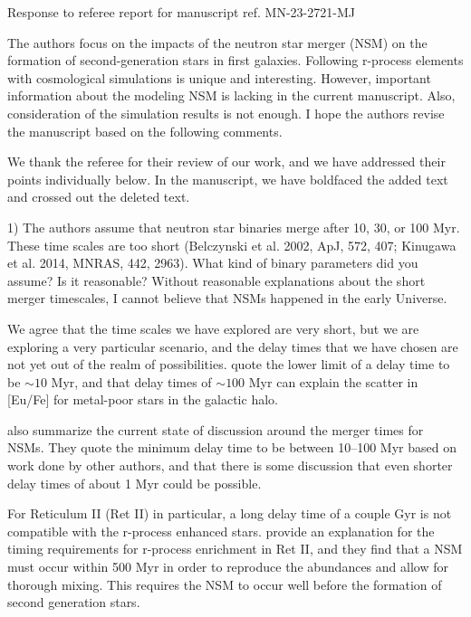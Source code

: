 \documentclass[11pt]{article}
\begin{document}
\begin{center} 
\bfseries{
\begin{large}
  Response to referee report for manuscript ref. MN-23-2721-MJ
\end{large}
}
\end{center}

\begin{tcolorbox}[colback={lightgray}]
    The authors focus on the impacts of the neutron star merger (NSM) on the formation of second-generation stars in first galaxies. Following r-process elements with cosmological simulations is unique and interesting. However, important information about the modeling NSM is lacking in the current manuscript. Also, consideration of the simulation results is not enough. I hope the authors revise the manuscript based on the following comments.
\end{tcolorbox}

We thank the referee for their review of our work, and we have
addressed their points individually below.  In the manuscript, we have
boldfaced the added text and crossed out the deleted text.  

\begin{tcolorbox}[colback={lightgray}]
    1)      The authors assume that neutron star binaries merge after 10, 30, or 100 Myr. These time scales are too short (Belczynski et al. 2002, ApJ, 572, 407; Kinugawa et al. 2014, MNRAS, 442, 2963). What kind of binary parameters did you assume? Is it reasonable? Without reasonable explanations about the short merger timescales, I cannot believe that NSMs happened in the early Universe.
\end{tcolorbox}

We agree that the time scales we have explored are very short, but we are exploring a very particular scenario, and the delay times that we have chosen are not yet out of the realm of possibilities. \citet{Hirai15} quote the lower limit of a delay time to be $\sim10$ Myr, and that delay times of $\sim100$ Myr can explain the scatter in [Eu/Fe] for metal-poor stars in the galactic halo. 

\citet{Frebel23} also summarize the current state of discussion around the merger times for NSMs. They quote the minimum delay time to be between 10--100 Myr based on work done by other authors, and that there is some discussion that even shorter delay times of about 1 Myr could be possible.

For Reticulum II (Ret II) in particular, a long delay time of a couple Gyr is not compatible with the r-process enhanced stars. \citet{Simon23} provide an explanation for the timing requirements for r-process enrichment in Ret II, and they find that a NSM must occur within 500 Myr in order to reproduce the abundances and allow for thorough mixing. This requires the NSM to occur well before the formation of second generation stars.
\end{document}
